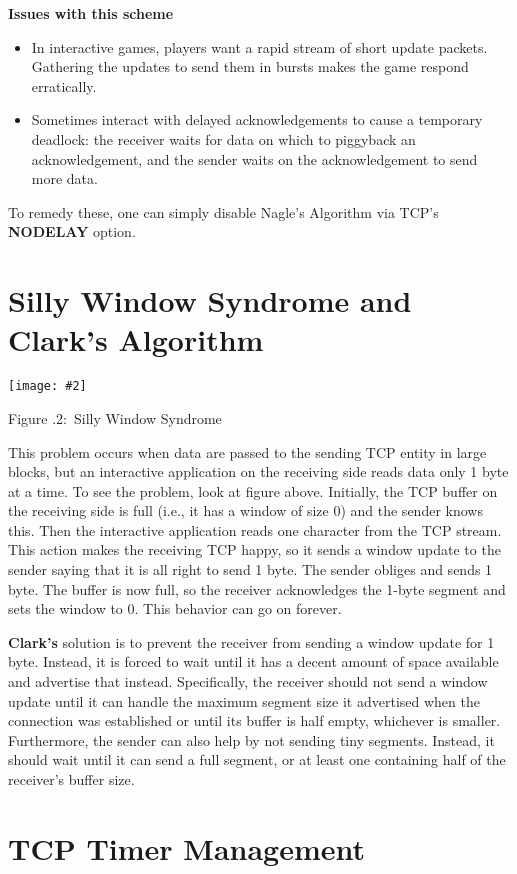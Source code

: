 \documentclass[twoside]{article}
\newcounter{lecnum}
\newcommand{\fig}[3]{
			\vspace{#2}
			\begin{center}
			Figure \thelecnum.#1:~#3
			\end{center}
   }
\newcommand{\iph}[2]{
   \texttt{[image: \#2]}
}
\begin{document}
\textbf{Issues with this scheme}
\begin{itemize}
   \item In interactive games, players want a rapid stream of short update packets. Gathering the updates to send them in bursts makes the game respond erratically.
   \item Sometimes interact with delayed acknowledgements to cause a temporary deadlock: the receiver waits for data on which to piggyback an acknowledgement, and the sender waits on the acknowledgement to send more data.
\end{itemize}

To remedy these, one can simply disable Nagle's Algorithm via TCP's \textbf{NODELAY} option.

\section{Silly Window Syndrome and Clark's Algorithm}

\iph{0.8}{sws}

\fig{2}{0in}{Silly Window Syndrome}

This problem occurs when data are passed to the sending TCP entity in large blocks, but an interactive application on the receiving side reads data only 1 byte at a time. To see the problem, look at figure above. Initially, the TCP buffer on the receiving side is full (i.e., it has a window of size 0) and the sender knows this. Then the interactive application reads one character from the TCP stream. This action makes the receiving TCP happy, so it sends a window update to the sender saying that it is all right to send 1 byte. The sender obliges and sends 1 byte. The buffer is now full, so the receiver acknowledges the 1-byte segment and sets the window to 0. This behavior can go on forever.

\textbf{Clark’s} solution is to prevent the receiver from sending a window update for 1 byte. Instead, it is forced to wait until it has a decent amount of space available and advertise that instead. Specifically, the receiver should not send a window update until it can handle the maximum segment size it advertised when the connection was established or until its buffer is half empty, whichever is smaller. Furthermore, the sender can also help by not sending tiny segments. Instead, it should wait until it can send a full segment, or at least one containing half of the receiver’s buffer size.

\section{TCP Timer Management}
\end{document}
